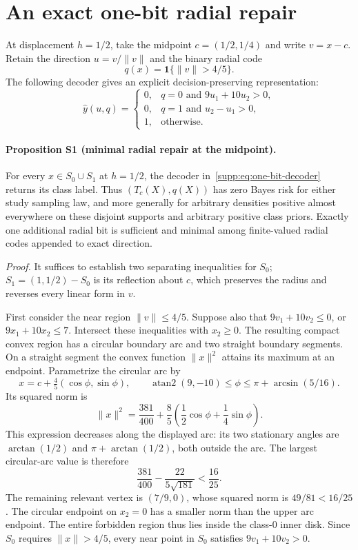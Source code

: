 \section{An exact one-bit radial repair}
\label{supp:one-bit}

At displacement $h=1/2$, take the midpoint $c=(1/2,1/4)$ and write $v=x-c$. Retain the direction $u=v/\|v\|$ and the binary radial code
\begin{equation}
 q(x)=\mathbf 1\{\|v\|>4/5\}.
 \label{supp:eq:one-bit-code}
\end{equation}
The following decoder gives an explicit decision-preserving representation:
\begin{equation}
 \widehat y(u,q)=
 \begin{cases}
 0,&q=0\text{ and }9u_1+10u_2>0,\\
 0,&q=1\text{ and }u_2-u_1>0,\\
 1,&\text{otherwise}.
 \end{cases}
 \label{supp:eq:one-bit-decoder}
\end{equation}

\paragraph{Proposition S1 (minimal radial repair at the midpoint).}
For every $x\in S_0\cup S_1$ at $h=1/2$, the decoder in~\eqref{supp:eq:one-bit-decoder} returns its class label. Thus $(T_c(X),q(X))$ has zero Bayes risk for either study sampling law, and more generally for arbitrary densities positive almost everywhere on these disjoint supports and arbitrary positive class priors. Exactly one additional radial bit is sufficient and minimal among finite-valued radial codes appended to exact direction.

\emph{Proof.}
It suffices to establish two separating inequalities for $S_0$; $S_1=(1,1/2)-S_0$ is its reflection about $c$, which preserves the radius and reverses every linear form in $v$.

First consider the near region $\|v\|\leq4/5$. Suppose also that $9v_1+10v_2\leq0$, or $9x_1+10x_2\leq7$. Intersect these inequalities with $x_2\geq0$. The resulting compact convex region has a circular boundary arc and two straight boundary segments. On a straight segment the convex function $\|x\|^2$ attains its maximum at an endpoint. Parametrize the circular arc by
\[
 x=c+\tfrac45(\cos\phi,\sin\phi),\qquad
 \operatorname{atan2}(9,-10)\leq\phi\leq\pi+\arcsin(5/16).
\]
Its squared norm is
\[
 \|x\|^2=\frac{381}{400}
        +\frac85\left(\frac12\cos\phi+\frac14\sin\phi\right).
\]
This expression decreases along the displayed arc: its two stationary angles are $\arctan(1/2)$ and $\pi+\arctan(1/2)$, both outside the arc. The largest circular-arc value is therefore
\[
 \frac{381}{400}-\frac{22}{5\sqrt{181}}<\frac{16}{25}.
\]
The remaining relevant vertex is $(7/9,0)$, whose squared norm is $49/81<16/25$. The circular endpoint on $x_2=0$ has a smaller norm than the upper arc endpoint. The entire forbidden region thus lies inside the class-0 inner disk. Since $S_0$ requires $\|x\|>4/5$, every near point in $S_0$ satisfies $9v_1+10v_2>0$.

